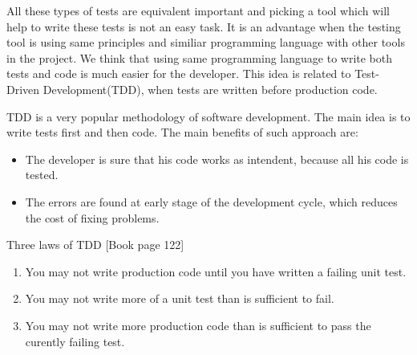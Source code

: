 		All these types of tests are equivalent important and picking a tool which
		will help to write these tests is not an easy task. It is an advantage when
		the testing tool is using same principles and similiar programming language
		with other tools in the project. We think that using same programming language
		to write both tests and code is much easier for the developer. This idea is
		related to Test-Driven Development(TDD), when tests are written
		before production code.
		
		TDD is a very popular methodology of software development. The main idea is to
		write tests first and then code. The main benefits of such approach are:
			\begin{itemize}
			  \item The developer is sure that his code works as intendent, because all his
				code is tested.
				\item The errors are found at early stage of the development cycle, which
				reduces the cost of fixing problems.
			\end{itemize}
			
			Three laws of TDD \cite[pp122]{Cleancode}[Book page 122]
				\begin{enumerate}
				  \item You may not write production code until you have written a failing unit	test.
				  \item You may not write more of a unit test than is sufficient to fail.
				  \item You may not write more production code than is sufficient to pass the
				curently failing test.
				\end{enumerate}
			\iffalse	
					\subsection {Approaches in Web Testing}	
						\begin{textit}
							In this chapter I will explain
							what does testing actually meands. What types of testing exist: unit, integration, user-interface, regression,
						etc. What are the differences between these types of testing.
						
						Next I will prove why testing is so important in software development. Here I
						would like to mention some information about \textit{Quality control}. The
						idea is to show that testing increseases the speed of software development
						and also improves it's quality. So in terms of quality control testing will
						decrease the price and increase the value of the product for the end user.
						
						Also I want to mention other methodologies like \textit{Agile development},
						\textit{User experience design} and \textit{Test Driven Development}. And how
						testing can be used/integrated with these methodologies/processes.
						\end{textit}
			\fi